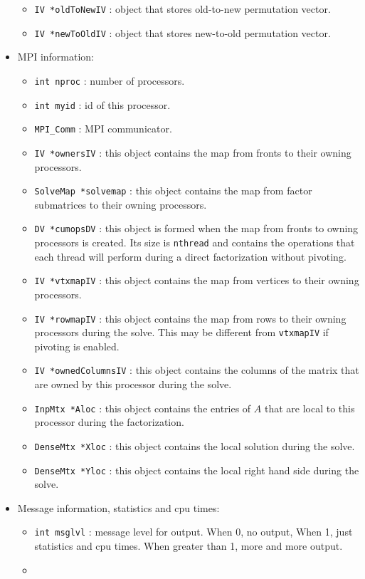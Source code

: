 \begin{itemize}
\begin{itemize}
\item
{\tt IV *oldToNewIV} : object that stores old-to-new permutation vector.
\item
{\tt IV *newToOldIV} : object that stores new-to-old permutation vector.
\end{itemize}
%
\item MPI information:
\begin{itemize}
\item
{\tt int nproc} : number of processors.
\item
{\tt int myid} : id of this processor.
\item
{\tt MPI\_Comm} : MPI communicator.
\item
{\tt IV *ownersIV} : this object contains the map from fronts to
their owning processors.
\item
{\tt SolveMap *solvemap} : this object contains the map from factor
submatrices to their owning processors.
\item
{\tt DV *cumopsDV} : this object is formed when the map from
fronts to owning processors is created.
Its size is {\tt nthread} and contains the operations that each
thread will perform during a direct factorization without pivoting.
\item
{\tt IV *vtxmapIV} : this object contains the map from vertices
to their owning processors.
\item
{\tt IV *rowmapIV} : this object contains the map from rows
to their owning processors during the solve. This may be different
from {\tt vtxmapIV} if pivoting is enabled.
\item
{\tt IV *ownedColumnsIV} : this object contains the columns of the
matrix that are owned by this processor during the solve.
\item
{\tt InpMtx *Aloc} : this object contains the entries of $A$ that
are local to this processor during the factorization.
\item
{\tt DenseMtx *Xloc} : this object contains the local solution
during the solve.
\item
{\tt DenseMtx *Yloc} : this object contains the local right hand
side during the solve.
\end{itemize}
%
\item Message information, statistics and cpu times:
\begin{itemize}
\item
{\tt int msglvl} : message level for output.
When 0, no output, When 1, just statistics and cpu times.
When greater than 1, more and more output.
\item

\end{itemize}
\end{itemize}
